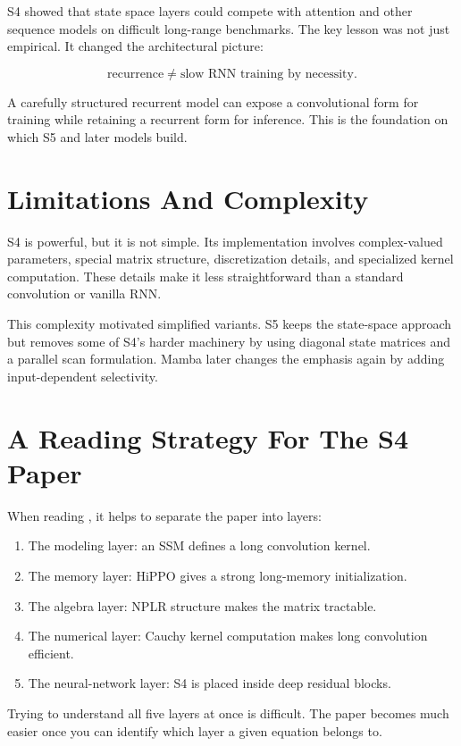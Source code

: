 S4 showed that state space layers could compete with attention and other sequence models
on difficult long-range benchmarks. The key lesson was not just empirical. It changed the
architectural picture:

\[
  \text{recurrence}
  \neq
  \text{slow RNN training by necessity}.
\]

A carefully structured recurrent model can expose a convolutional form for training while
retaining a recurrent form for inference. This is the foundation on which S5 and later
models build.

\section{Limitations And Complexity}

S4 is powerful, but it is not simple. Its implementation involves complex-valued
parameters, special matrix structure, discretization details, and specialized kernel
computation. These details make it less straightforward than a standard convolution or
vanilla RNN.

This complexity motivated simplified variants. S5 keeps the state-space approach but
removes some of S4's harder machinery by using diagonal state matrices and a parallel
scan formulation. Mamba later changes the emphasis again by adding input-dependent
selectivity.

\section{A Reading Strategy For The S4 Paper}

When reading \citet{gu2022s4}, it helps to separate the paper into layers:

\begin{enumerate}
  \item The modeling layer: an SSM defines a long convolution kernel.
  \item The memory layer: HiPPO gives a strong long-memory initialization.
  \item The algebra layer: NPLR structure makes the matrix tractable.
  \item The numerical layer: Cauchy kernel computation makes long convolution efficient.
  \item The neural-network layer: S4 is placed inside deep residual blocks.
\end{enumerate}

Trying to understand all five layers at once is difficult. The paper becomes much easier
once you can identify which layer a given equation belongs to.

